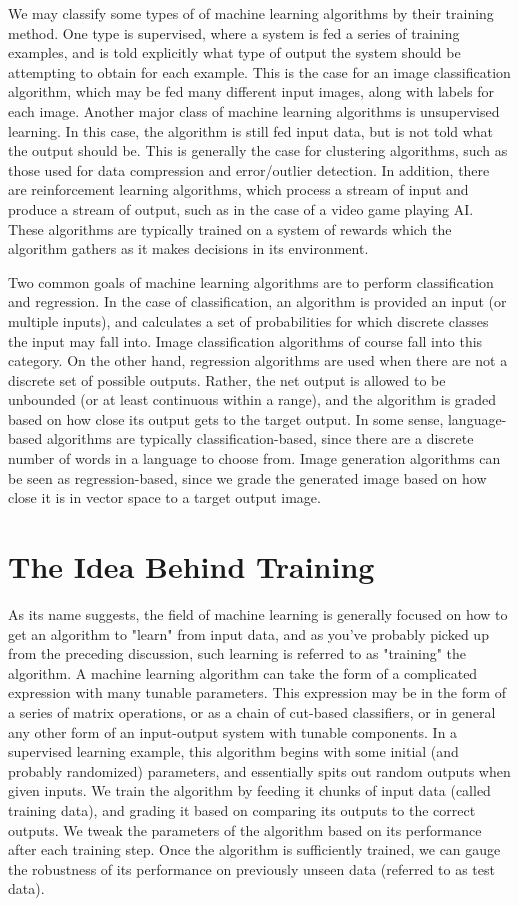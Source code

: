 We may classify some types of of machine learning algorithms by their training method. One type is supervised, where a system is fed a series of training examples, and is told explicitly what type of output the system should be attempting to obtain for each example. This is the case for an image classification algorithm, which may be fed many different input images, along with labels for each image. Another major class of machine learning algorithms is unsupervised learning. In this case, the algorithm is still fed input data, but is not told what the output should be. This is generally the case for clustering algorithms, such as those used for data compression and error/outlier detection. In addition, there are reinforcement learning algorithms, which process a stream of input and produce a stream of output, such as in the case of a video game playing AI. These algorithms are typically trained on a system of rewards which the algorithm gathers as it makes decisions in its environment.

Two common goals of machine learning algorithms are to perform classification and regression. In the case of classification, an algorithm is provided an input (or multiple inputs), and calculates a set of probabilities for which discrete classes the input may fall into. Image classification algorithms of course fall into this category. On the other hand, regression algorithms are used when there are not a discrete set of possible outputs. Rather, the net output is allowed to be unbounded (or at least continuous within a range), and the algorithm is graded based on how close its output gets to the target output. In some sense, language-based algorithms are typically classification-based, since there are a discrete number of words in a language to choose from. Image generation algorithms can be seen as regression-based, since we grade the generated image based on how close it is in vector space to a target output image.

\section{The Idea Behind Training}

As its name suggests, the field of machine learning is generally focused on how to get an algorithm to "learn" from input data, and as you've probably picked up from the preceding discussion, such learning is referred to as "training" the algorithm. A machine learning algorithm can take the form of a complicated expression with many tunable parameters. This expression may be in the form of a series of matrix operations, or as a chain of cut-based classifiers, or in general any other form of an input-output system with tunable components. In a supervised learning example, this algorithm begins with some initial (and probably randomized) parameters, and essentially spits out random outputs when given inputs. We train the algorithm by feeding it chunks of input data (called training data), and grading it based on comparing its outputs to the correct outputs. We tweak the parameters of the algorithm based on its performance after each training step. Once the algorithm is sufficiently trained, we can gauge the robustness of its performance on previously unseen data (referred to as test data).

